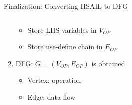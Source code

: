 \documentclass{beamer}
\begin{document}
\begin{CJK}{UTF8}{bkai}
\begin{frame}{Finalization: Converting HSAIL to DFG}
\begin{columns}
\begin{column}{0.6\textwidth}
\begin{enumerate}
{                                \begin{itemize}
                                    \item Store LHS variables in $V_{OP}$
                                    \item Store use-define chain in $E_{OP}$
                                \end{itemize}
                            }
                        \item <5->{DFG: $G = (V_{OP}, E_{OP})$ is obtained.
                                \begin{itemize}
                                    \item Vertex: operation
                                    \item Edge: data flow
                                \end{itemize}
                            }
                        \end{enumerate}
                    \end{column}
                \end{columns}
                \vspace{-1em}
            \end{frame}


\end{CJK}
\end{document}
